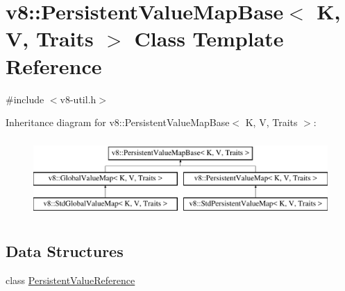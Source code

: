 \hypertarget{classv8_1_1PersistentValueMapBase}{}\section{v8\+:\+:Persistent\+Value\+Map\+Base$<$ K, V, Traits $>$ Class Template Reference}
\label{classv8_1_1PersistentValueMapBase}


{\ttfamily \#include $<$v8-\/util.\+h$>$}

Inheritance diagram for v8\+:\+:Persistent\+Value\+Map\+Base$<$ K, V, Traits $>$\+:\begin{figure}[H]
\begin{center}
\leavevmode
\includegraphics[height=3.000000cm]{classv8_1_1PersistentValueMapBase}
\end{center}
\end{figure}
\subsection*{Data Structures}
\begin{DoxyCompactItemize}
\item 
class \mbox{\hyperlink{classv8_1_1PersistentValueMapBase_1_1PersistentValueReference}{Persistent\+Value\+Reference}}
\end{DoxyCompactItemize}
